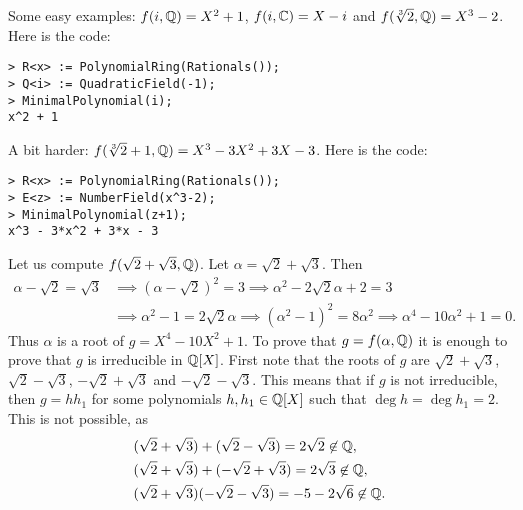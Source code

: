 Some easy examples: $f(i,\mathbb{Q})=X^2+1$, 
$f(i,\mathbb{C})=X-i$ and 
$f(\sqrt[3]{2},\mathbb{Q})=X^3-2$. Here is the code:  
\begin{lstlisting}
> R<x> := PolynomialRing(Rationals());
> Q<i> := QuadraticField(-1);
> MinimalPolynomial(i);
x^2 + 1
\end{lstlisting}
A bit harder: $f(\sqrt[3]{2}+1,\mathbb{Q})=X^3 - 3X^2 + 3X - 3$. Here is the code: 
\begin{lstlisting}
> R<x> := PolynomialRing(Rationals());
> E<z> := NumberField(x^3-2);
> MinimalPolynomial(z+1);
x^3 - 3*x^2 + 3*x - 3
\end{lstlisting}


\begin{example}
	Let us compute 
	$f(\sqrt{2}+\sqrt{3},\mathbb{Q})$. Let $\alpha=\sqrt{2}+\sqrt{3}$. 
	Then 
	\begin{align*}
		\alpha-\sqrt{2}=\sqrt{3} & \implies 
		(\alpha-\sqrt{2})^2=3 \implies \alpha^2-2\sqrt{2}\alpha+2=3\\
		&\implies \alpha^2-1=2\sqrt{2}\alpha \implies
		(\alpha^2-1)^2=8\alpha^2\implies
		\alpha^4-10\alpha^2+1=0.
	\end{align*}
	Thus $\alpha$ is a root of $g=X^4-10X^2+1$. To prove that $g=f(\alpha,\mathbb{Q})$ 
	it is enough to prove that 
	$g$ is irreducible in $\mathbb{Q}[X]$. First note that 
	the roots
	of $g$ are $\sqrt{2}+\sqrt{3}$, $\sqrt{2}-\sqrt{3}$, 
	$-\sqrt{2}+\sqrt{3}$ and $-\sqrt{2}-\sqrt{3}$. This means that
	if $g$ is not irreducible, 
	then $g=hh_1$ for some polynomials $h,h_1\in\mathbb{Q}[X]$ such that
	$\deg h=\deg h_1=2$. This is not possible, as 
	\begin{align*}
   & (\sqrt{2}+\sqrt{3})+(\sqrt{2}-\sqrt{3})=2\sqrt{2}\not\in\mathbb{Q},\\
   & (\sqrt{2}+\sqrt{3})+(-\sqrt{2}+\sqrt{3})=2\sqrt{3}\not\in\mathbb{Q},\\ 
   & (\sqrt{2}+\sqrt{3})(-\sqrt{2}-\sqrt{3})=-5-2\sqrt{6}\not\in\mathbb{Q}.
    \end{align*}
\end{example}



